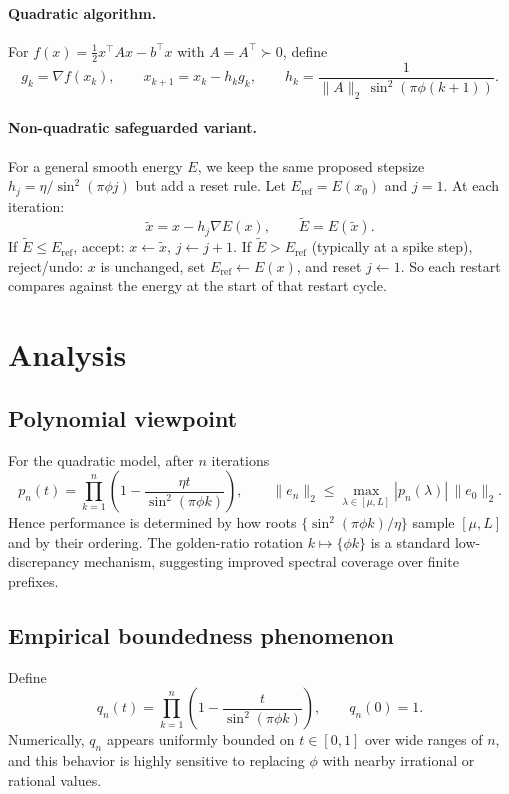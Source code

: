 \documentclass{article}
\begin{document}
\paragraph{Quadratic algorithm.}
For $f(x)=\frac12 x^\top A x-b^\top x$ with $A=A^\top\succ0$, define
\[
g_k=\nabla f(x_k),\qquad
x_{k+1}=x_k-h_k g_k,\qquad
h_k=\frac{1}{\|A\|_2\,\sin^2(\pi\phi(k+1))}.
\]

\paragraph{Non-quadratic safeguarded variant.}
For a general smooth energy $E$, we keep the same proposed stepsize
$h_j=\eta/\sin^2(\pi\phi j)$ but add a reset rule. Let $E_{\mathrm{ref}}=E(x_0)$ and
$j=1$.
At each iteration:
\[
\tilde x=x-h_j\nabla E(x),\qquad \tilde E=E(\tilde x).
\]
If $\tilde E\le E_{\mathrm{ref}}$, accept: $x\leftarrow\tilde x$, $j\leftarrow j+1$.
If $\tilde E>E_{\mathrm{ref}}$ (typically at a spike step), reject/undo:
$x$ is unchanged, set $E_{\mathrm{ref}}\leftarrow E(x)$, and reset $j\leftarrow1$.
So each restart compares against the energy at the start of that restart cycle.

\section{Analysis}

\subsection{Polynomial viewpoint}

For the quadratic model, after $n$ iterations
\[
p_n(t)=\prod_{k=1}^n\left(1-\frac{\eta t}{\sin^2(\pi\phi k)}\right),
\qquad
\|e_n\|_2\le \max_{\lambda\in[\mu,L]}|p_n(\lambda)|\,\|e_0\|_2.
\]
Hence performance is determined by how roots $\{\sin^2(\pi\phi k)/\eta\}$ sample $[\mu,L]$ and by
their ordering. The golden-ratio rotation
$k\mapsto \{\phi k\}$ is a standard low-discrepancy mechanism, suggesting improved
spectral coverage over finite prefixes.

\subsection{Empirical boundedness phenomenon}

Define
\[
q_n(t)=\prod_{k=1}^n\left(1-\frac{t}{\sin^2(\pi\phi k)}\right),\qquad q_n(0)=1.
\]
Numerically, $q_n$ appears uniformly bounded on $t\in[0,1]$ over wide ranges of $n$,
and this behavior is highly sensitive to replacing $\phi$ with nearby irrational or
rational values.
\end{document}
